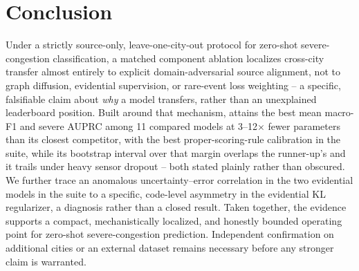 \section{Conclusion}
\label{sec:conclusion}

Under a strictly source-only, leave-one-city-out protocol for zero-shot severe-congestion
classification, a matched component ablation localizes cross-city transfer almost entirely to
explicit domain-adversarial source alignment, not to graph diffusion, evidential supervision, or
rare-event loss weighting -- a specific, falsifiable claim about \emph{why} a model transfers,
rather than an unexplained leaderboard position. Built around that mechanism, \methodname{}
attains the best mean macro-F1 and severe AUPRC among 11 compared models at 3--12$\times$ fewer
parameters than its closest competitor, with the best proper-scoring-rule calibration in the
suite, while its bootstrap interval over that margin overlaps the runner-up's and it trails under
heavy sensor dropout -- both stated plainly rather than obscured. We further trace an anomalous
uncertainty--error correlation in the two evidential models in the suite to a specific,
code-level asymmetry in the evidential KL regularizer, a diagnosis rather than a closed result.
Taken together, the evidence supports a compact, mechanistically localized, and honestly bounded
operating point for zero-shot severe-congestion prediction. Independent confirmation on additional
cities or an external dataset remains necessary before any stronger claim is warranted.
